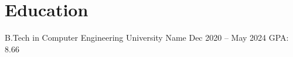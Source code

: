 
\vspace{-2.5mm}
\section{Education}

\resumeSubHeadingListStart
\resumeEdu
{B.Tech in Computer Engineering} 
{University Name} 
{Dec 2020 -- May 2024}
{GPA: 8.66}

\resumeSubHeadingListEnd
\vspace{-3.5mm}